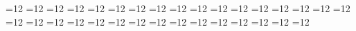 %
%
%

=12 %
{}=12 %
{}=12 %
{}=12 %
{}=12 %
{}=12 %
{}=12 %
{}=12 %
{}=12 %
{}=12 %
{}=12 %
{}=12 %
{}=12 %
{}=12 %
{}=12 %
{}=12 %
{}=12 %
{}=12 %
{}=12 %
{}=12 %
{}=12 %
{}=12 %
{}=12 %
{}=12 %
{}=12 %
{}=12 %
{}=12 %
{}=12 %
{}=12 %
{}=12 %
{}=12 %
{}=12 %
